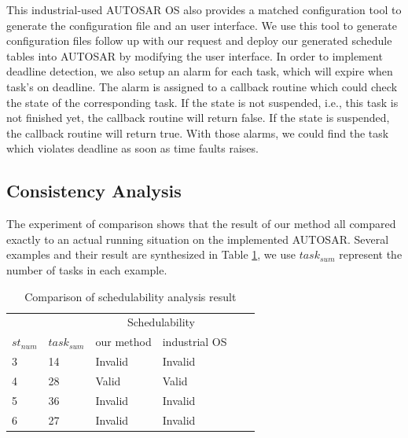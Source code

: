 \documentclass[sigconf]{acmart}
\begin{document}
This industrial-used AUTOSAR OS also provides a matched configuration tool to generate the configuration file and an user interface. We use this tool to generate configuration files follow up with our request and deploy our generated schedule tables into AUTOSAR by modifying the user interface. In order to implement deadline detection, we also setup an alarm for each task, which will expire when task's on deadline. The alarm is assigned to a callback routine which could check the state of the corresponding task. If the state is not suspended, i.e., this task is not finished yet, the callback routine will return false. If the state is suspended, the callback routine will return true. With those alarms, we could find the task which violates deadline as soon as time faults raises. 

\subsection{Consistency Analysis} 
The experiment of comparison shows that the result of our method all compared exactly to an actual running situation on the implemented AUTOSAR. Several examples and their result are synthesized in Table \ref{table_compare}, we use $task_{sum}$ represent the number of tasks in each example. %


\begin{table}[htbp]
  \centering
  \begin{tabular}{llllll}
    \toprule
    &&\multicolumn{2}{c}{Schedulability}\\
    \cmidrule{3-4}
    $st_{num}$ & $task_{sum}$ & our method & industrial OS\\
    \midrule
    3&14&Invalid&Invalid\\
    4&28&  Valid&    Valid\\
    5&36&Invalid&Invalid\\
    6&27&Invalid&Invalid\\
    
    \bottomrule
  \end{tabular}
  \caption{Comparison of schedulability analysis result}
  \label{table_compare}
\end{table}
\end{document}
